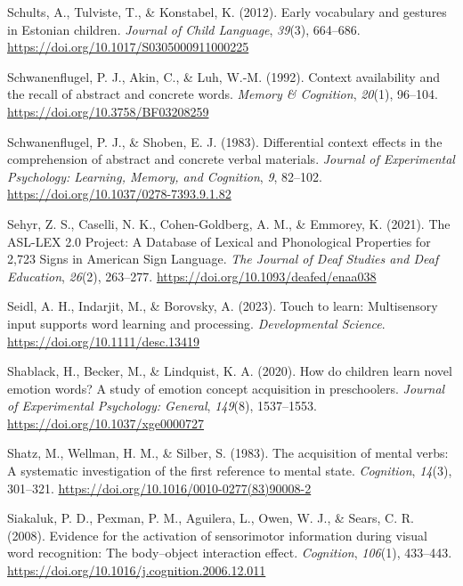 \documentclass[
  man,floatsintext]{apa6}
\newlength{\cslhangindent}
\newenvironment{CSLReferences}[2] %
 {\begin{list}{}{%
  \setlength{\itemindent}{0pt}
  \setlength{\leftmargin}{0pt}
  \setlength{\parsep}{0pt}
  \ifodd #1
   \setlength{\leftmargin}{\cslhangindent}
   \setlength{\itemindent}{-1\cslhangindent}
  \fi
  \setlength{\itemsep}{#2\baselineskip}}}
 {\end{list}}
\begin{document}
\begin{CSLReferences}{1}{0}
Schults, A., Tulviste, T., \& Konstabel, K. (2012). Early vocabulary and gestures in {Estonian} children. \emph{Journal of Child Language}, \emph{39}(3), 664--686. \url{https://doi.org/10.1017/S0305000911000225}

Schwanenflugel, P. J., Akin, C., \& Luh, W.-M. (1992). Context availability and the recall of abstract and concrete words. \emph{Memory \& Cognition}, \emph{20}(1), 96--104. \url{https://doi.org/10.3758/BF03208259}

Schwanenflugel, P. J., \& Shoben, E. J. (1983). Differential context effects in the comprehension of abstract and concrete verbal materials. \emph{Journal of Experimental Psychology: Learning, Memory, and Cognition}, \emph{9}, 82--102. \url{https://doi.org/10.1037/0278-7393.9.1.82}

Sehyr, Z. S., Caselli, N. K., Cohen-Goldberg, A. M., \& Emmorey, K. (2021). The {ASL-LEX} 2.0 {Project}: {A Database} of {Lexical} and {Phonological Properties} for 2,723 {Signs} in {American Sign Language}. \emph{The Journal of Deaf Studies and Deaf Education}, \emph{26}(2), 263--277. \url{https://doi.org/10.1093/deafed/enaa038}

Seidl, A. H., Indarjit, M., \& Borovsky, A. (2023). Touch to learn: {Multisensory} input supports word learning and processing. \emph{Developmental Science}. \url{https://doi.org/10.1111/desc.13419}

Shablack, H., Becker, M., \& Lindquist, K. A. (2020). How do children learn novel emotion words? {A} study of emotion concept acquisition in preschoolers. \emph{Journal of Experimental Psychology: General}, \emph{149}(8), 1537--1553. \url{https://doi.org/10.1037/xge0000727}

Shatz, M., Wellman, H. M., \& Silber, S. (1983). The acquisition of mental verbs: {A} systematic investigation of the first reference to mental state. \emph{Cognition}, \emph{14}(3), 301--321. \url{https://doi.org/10.1016/0010-0277(83)90008-2}

Siakaluk, P. D., Pexman, P. M., Aguilera, L., Owen, W. J., \& Sears, C. R. (2008). Evidence for the activation of sensorimotor information during visual word recognition: {The} body--object interaction effect. \emph{Cognition}, \emph{106}(1), 433--443. \url{https://doi.org/10.1016/j.cognition.2006.12.011}


\end{CSLReferences}
\end{document}
